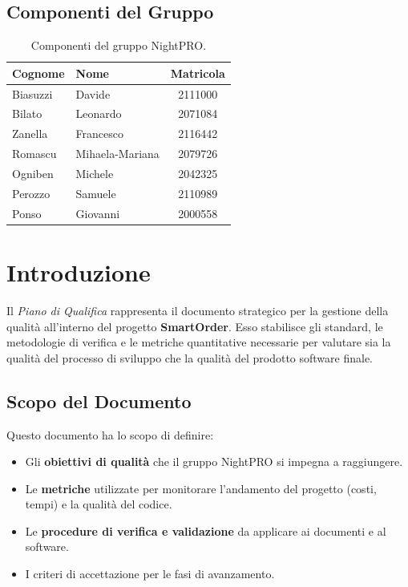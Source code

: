 \documentclass[a4paper,11pt,oneside]{scrartcl}
\begin{document}
\subsection*{Componenti del Gruppo}

\begin{table}[h!]
    \centering
    \renewcommand{\arraystretch}{1.2}
    \begin{tabular}{@{}llc@{}}
        \toprule
        \textbf{Cognome} & \textbf{Nome}   & \textbf{Matricola} \\
        \midrule
        Biasuzzi         & Davide          & 2111000            \\
        Bilato           & Leonardo        & 2071084            \\
        Zanella          & Francesco       & 2116442            \\
        Romascu          & Mihaela-Mariana & 2079726            \\
        Ogniben          & Michele         & 2042325            \\
        Perozzo          & Samuele         & 2110989            \\
        Ponso            & Giovanni        & 2000558            \\
        \bottomrule
    \end{tabular}
    \caption{Componenti del gruppo NightPRO.}
\end{table}

\newpage
\section{Introduzione}

Il \textit{Piano di Qualifica} rappresenta il documento strategico per la gestione della qualità all'interno del progetto \textbf{SmartOrder}. Esso stabilisce gli standard, le metodologie di verifica e le metriche quantitative necessarie per valutare sia la qualità del processo di sviluppo che la qualità del prodotto software finale.

\subsection{Scopo del Documento}
Questo documento ha lo scopo di definire:
\begin{itemize}
    \item Gli \textbf{obiettivi di qualità} che il gruppo NightPRO si impegna a raggiungere.
    \item Le \textbf{metriche} utilizzate per monitorare l'andamento del progetto (costi, tempi) e la qualità del codice.
    \item Le \textbf{procedure di verifica e validazione} da applicare ai documenti e al software.
    \item I criteri di accettazione per le fasi di avanzamento.
\end{itemize}
\end{document}
